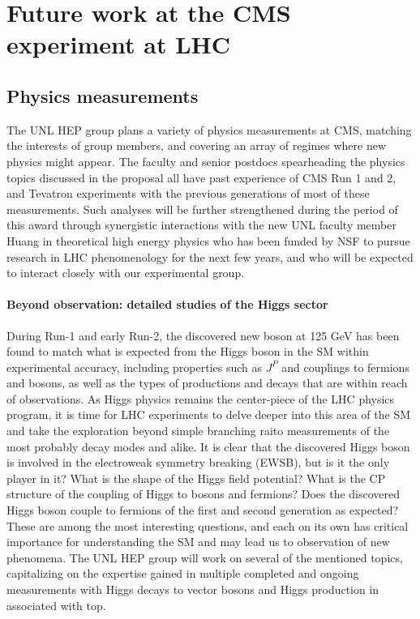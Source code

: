 \section{Future work at the CMS experiment at LHC}
\label{sec:future}

\subsection{Physics measurements}

The UNL HEP group plans a variety of physics measurements at CMS, matching the interests of group members, and covering an array of regimes where new physics might appear. The faculty and senior postdocs spearheading the physics topics discussed in the proposal all have past experience of CMS Run 1 and 2, and Tevatron experiments with the previous generations of most of these measurements. Such analyses will be further strengthened during the period of this award through synergistic interactions with the new UNL faculty member Huang in theoretical high energy physics who has been funded by NSF to pursue research in LHC phenomenology for the next few years, and who will be expected to interact closely with our experimental group.

\paragraph{Beyond observation: detailed studies of the Higgs sector} 
During Run-1 and early Run-2, the discovered new boson at 125 GeV has been found to match what is expected from the Higgs boson in the SM within experimental accuracy, including properties such as $J^P$ and couplings to fermions and bosons, as well as the types of productions and decays that are within reach of observations. As Higgs physics remains the center-piece of the LHC physics program, it is time for LHC experiments to delve deeper into this area of the SM and take the exploration beyond simple branching raito measurements of the most probably decay modes and alike. It is clear that the discovered Higgs boson is involved in the electroweak symmetry breaking (EWSB), but is it the only player in it? What is the shape of the Higgs field potential? What is the CP structure of the coupling of Higgs to bosons and fermions? Does the discovered Higgs boson couple to fermions of the first and second generation as expected? These are among the most interesting questions, and each on its own has critical importance for understanding the SM and may lead us to observation of new phenomena. The UNL HEP group will work on several of the mentioned topics, capitalizing on the expertise gained in multiple completed and ongoing measurements with Higgs decays to vector bosons and Higgs production in associated with top.

